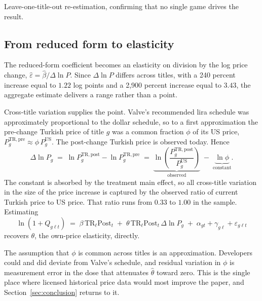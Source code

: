 \documentclass[11pt]{article}
\begin{document}
Leave-one-title-out re-estimation, confirming that no single game drives the result.

\subsection{From reduced form to elasticity}\label{sec:dose}

The reduced-form coefficient becomes an elasticity on division by the log price change,
$\hat\varepsilon = \hat\beta / \Delta \ln P$. Since $\Delta \ln P$ differs across titles, with a
240 percent increase equal to $1.22$ log points and a 2{,}900 percent increase equal to $3.43$, the
aggregate estimate delivers a range rather than a point.

Cross-title variation supplies the point. Valve's recommended lira schedule was approximately
proportional to the dollar schedule, so to a first approximation the pre-change Turkish price of
title $g$ was a common fraction $\phi$ of its US price,
$P^{\mathrm{TR,pre}}_g \approx \phi\, P^{\mathrm{US}}_g$. The post-change Turkish price is observed
today. Hence
\begin{equation}
\Delta \ln P_g \;=\; \ln P^{\mathrm{TR,post}}_g - \ln P^{\mathrm{TR,pre}}_g
\;=\; \underbrace{\ln\!\left(\frac{P^{\mathrm{TR,post}}_g}{P^{\mathrm{US}}_g}\right)}_{\text{observed}}
\;-\; \underbrace{\ln \phi}_{\text{constant}} .
\label{eq:dose}
\end{equation}
The constant is absorbed by the treatment main effect, so all cross-title variation in the size of
the price increase is captured by the observed ratio of current Turkish price to US price. That
ratio runs from $0.33$ to $1.00$ in the sample. Estimating
\begin{equation}
\ln\!\left(1+Q_{g\ell t}\right) \;=\; \beta\, \mathrm{TR}_\ell \mathrm{Post}_t
\;+\; \theta\, \mathrm{TR}_\ell \mathrm{Post}_t \,\Delta\!\ln\! P_g
\;+\; \alpha_{gt} + \gamma_{g\ell} + \varepsilon_{g\ell t}
\label{eq:dosereg}
\end{equation}
recovers $\theta$, the own-price elasticity, directly.

The assumption that $\phi$ is common across titles is an approximation. Developers could and did
deviate from Valve's schedule, and residual variation in $\phi$ is measurement error in the dose
that attenuates $\hat\theta$ toward zero. This is the single place where licensed historical price
data would most improve the paper, and Section~\ref{sec:conclusion} returns to it.

\end{document}
